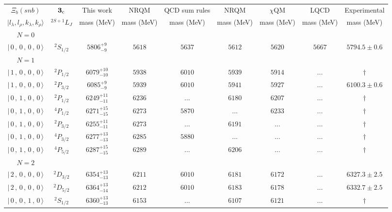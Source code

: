 \begin{tabular}{c c| c c c c c c c}\hline \hline
$\Xi_{b}(snb)$& ${\bf {3}}_{\rm c}$& This work   &   NRQM \cite{Yoshida2015}     &  QCD sum rules \cite{Liu2008, Mao2015, Chen2016}      &  NRQM \cite{Roberts2008}    & $\chi$QM \cite{Kim2021}        & LQCD \cite{Mohanta2020}     & Experimental  \\ 
 $\vert l_{\lambda}, l_{\rho}, k_{\lambda}, k_{\rho} \rangle$ & $^{2S+1}L_{J}$ & mass (MeV)  &   mass (MeV)  &  mass (MeV)  &  mass (MeV) & mass (MeV) & mass (MeV) &      mass (MeV) \\ \hline
\hline
 $N=0$  &  &  &  &  &  \\ 
$\vert \,0\,,\,0\,,\,0\,,\,0 \,\rangle $ & $^{2}S_{1/2}$ & $5806^{+9}_{-9}$ & $5618$ & $5637$ & $5612$ & $5620$ & $5667$ & $5794.5\pm 0.6$ \\ 
\hline
 $N=1$  &  &  &  &  &  \\ 
$\vert \,1\,,\,0\,,\,0\,,\,0 \,\rangle $ & $^{2}P_{1/2}$ & $6079^{+10}_{-10}$ & $5938$ & $6010$ & $5939$ & $5914$ & ... & $\dagger$ \\ 
$\vert \,1\,,\,0\,,\,0\,,\,0 \,\rangle $ & $^{2}P_{3/2}$ & $6085^{+9}_{-9}$ & $5939$ & $6010$ & $5941$ & $5927$ & ... & $6100.3\pm 0.6$ \\ 
$\vert \,0\,,\,1\,,\,0\,,\,0 \,\rangle $ & $^{2}P_{1/2}$ & $6249^{+11}_{-11}$ & $6236$ & ... & $6180$ & $6207$ & ... & $\dagger$ \\ 
$\vert \,0\,,\,1\,,\,0\,,\,0 \,\rangle $ & $^{4}P_{1/2}$ & $6271^{+15}_{-15}$ & $6273$ & $5870$ & ... & $6233$ & ... & $\dagger$ \\ 
$\vert \,0\,,\,1\,,\,0\,,\,0 \,\rangle $ & $^{2}P_{3/2}$ & $6255^{+11}_{-11}$ & $6273$ & ... & $6191$ & ... & ... & $\dagger$ \\ 
$\vert \,0\,,\,1\,,\,0\,,\,0 \,\rangle $ & $^{4}P_{3/2}$ & $6277^{+13}_{-13}$ & $6285$ & $5880$ & ... & ... & ... & $\dagger$ \\ 
$\vert \,0\,,\,1\,,\,0\,,\,0 \,\rangle $ & $^{4}P_{5/2}$ & $6287^{+15}_{-15}$ & $6289$ & ... & $6206$ & ... & ... & $\dagger$ \\ 
\hline
 $N=2$  &  &  &  &  &  \\ 
$\vert \,2\,,\,0\,,\,0\,,\,0 \,\rangle $ & $^{2}D_{3/2}$ & $6354^{+13}_{-13}$ & $6211$ & $6010$ & $6181$ & $6172$ & ... & $6327.3\pm 2.5$ \\ 
$\vert \,2\,,\,0\,,\,0\,,\,0 \,\rangle $ & $^{2}D_{5/2}$ & $6364^{+13}_{-14}$ & $6212$ & $6010$ & $6183$ & $6178$ & ... & $6332.7\pm 2.5$ \\ 
$\vert \,0\,,\,0\,,\,1\,,\,0 \,\rangle $ & $^{2}S_{1/2}$ & $6360^{+13}_{-13}$ & $6153$ & ... & $6107$ & $6121$ & ... & $\dagger$ \\ 

\end{tabular}

